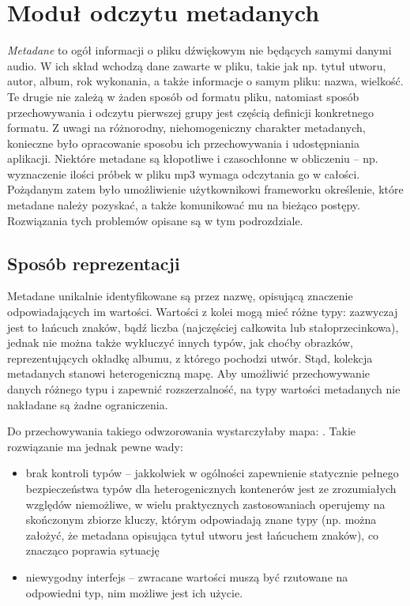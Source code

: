 
\section{Moduł odczytu metadanych}
\label{sec:metadane}

\emph{Metadane} to ogół informacji o pliku dźwiękowym nie będących samymi danymi audio. W ich skład
wchodzą dane zawarte w pliku, takie jak np. tytuł utworu, autor, album, rok wykonania, a także
informacje o samym pliku: nazwa, wielkość. Te drugie nie zależą w żaden sposób od formatu pliku,
natomiast sposób przechowywania i odczytu pierwszej grupy jest częścią definicji konkretnego
formatu. Z uwagi na różnorodny, niehomogeniczny charakter metadanych, konieczne było opracowanie
sposobu ich przechowywania i udostępniania aplikacji. Niektóre metadane są kłopotliwe i czasochłonne
w obliczeniu -- np. wyznaczenie ilości próbek w pliku mp3 wymaga odczytania go w całości. Pożądanym
zatem było umożliwienie użytkownikowi frameworku określenie, które metadane należy pozyskać, a także
komunikować mu na bieżąco postępy. Rozwiązania tych problemów opisane są w tym podrozdziale.

\subsection{Sposób reprezentacji}

Metadane unikalnie identyfikowane są przez nazwę, opisującą znaczenie odpowiadających im wartości.
Wartości z kolei mogą mieć różne typy: zazwyczaj jest to łańcuch znaków, bądź liczba (najczęściej
całkowita lub stałoprzecinkowa), jednak nie można także wykluczyć innych typów, jak choćby obrazków,
reprezentujących okładkę albumu, z którego pochodzi utwór. Stąd, kolekcja metadanych stanowi
heterogeniczną mapę. Aby umożliwić przechowywanie danych różnego typu i zapewnić rozszerzalność, na
typy wartości metadanych nie nakładane są żadne ograniczenia.

Do przechowywania takiego odwzorowania wystarczyłaby mapa: . Takie
rozwiązanie ma jednak pewne wady:

\begin{itemize}

  \item brak kontroli typów -- jakkolwiek w ogólności zapewnienie statycznie pełnego bezpieczeństwa
    typów dla heterogenicznych kontenerów jest ze zrozumiałych względów niemożliwe, w wielu
    praktycznych zastosowaniach operujemy na skończonym zbiorze kluczy, którym odpowiadają znane
    typy (np. można założyć, że metadana opisująca tytuł utworu jest łańcuchem znaków), co znacząco
    poprawia sytuację

  \item niewygodny interfejs -- zwracane wartości muszą być rzutowane na odpowiedni typ, nim możliwe
    jest ich użycie.

\end{itemize}

